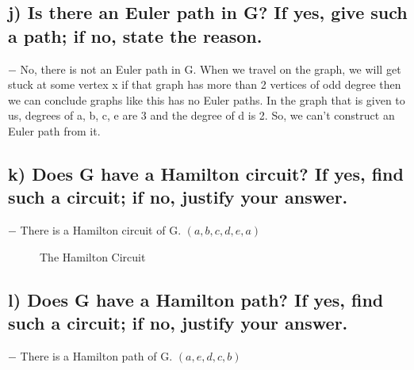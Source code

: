 \documentclass[12pt]{article}
\begin{document}
\subsection*{j) Is there an Euler path in G? If yes, give such a path; if no, state the reason.}

	$-$ No, there is not an Euler path in G. When we travel on the graph, we will get stuck at some vertex x if that graph has more than 2 vertices of odd degree then we can conclude graphs like this has no Euler paths. In the graph that is given to us, degrees of a, b, c, e are 3 and the degree of d is 2. So, we can't construct an Euler path from it.\\

\subsection*{k) Does G have a Hamilton circuit? If yes, find such a circuit; if no, justify your answer.}

	$-$ There is a Hamilton circuit of G. $(a,b,c,d,e,a)$\\

\begin{figure}[H]
	\centering
	\caption{The Hamilton Circuit}
\end{figure}

\subsection*{l) Does G have a Hamilton path? If yes, find such a circuit; if no, justify your answer.}

	$-$ There is a Hamilton path of G. $(a,e,d,c,b)$
\end{document}
